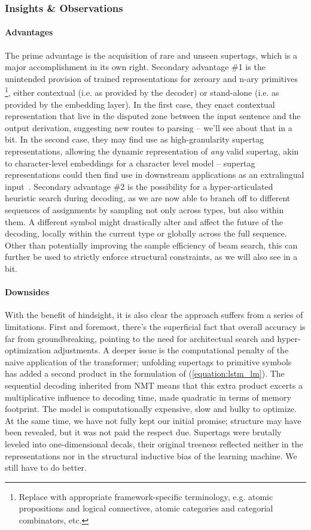 \subsubsection{Insights \& Observations}
\paragraph{Advantages}
The prime advantage is the acquisition of rare and unseen supertags, which is a major accomplishment in its own right.
Secondary advantage \#1 is the unintended provision of trained representations for zeroary and n-ary primitives%
	\footnote{Replace with appropriate framework-specific terminology, e.g. atomic propositions and logical connectives, atomic categories and categorial combinators, etc.},
either contextual (i.e. as provided by the decoder) or stand-alone (i.e. as provided by the embedding layer).
In the first case, they enact contextual representation that live in the disputed zone between the input sentence and the output derivation, suggesting new routes to parsing -- we'll see about that in a bit.
In the second case, they may find use as high-granularity supertag representations, allowing the dynamic representation of \textit{any} valid supertag, akin to character-level embeddings for a character level model -- supertag representations could then find use in downstream applications as an extralingual input~\cite{kasai-etal-2017-tag}.
Secondary advantage \#2 is the possibility for a hyper-articulated heuristic search during decoding, as we are now able to branch off to different sequences of assignments by sampling not only across types, but also within them.
A different symbol might drastically alter and affect the future of the decoding, locally within the current type or globally across the full sequence.
Other than potentially improving the sample efficiency of beam search, this can further be used to strictly enforce structural constraints, as we will also see in a bit.

\paragraph{Downsides}
With the benefit of hindsight, it is also clear the approach suffers from a series of limitations.
First and foremost, there's the superficial fact that overall accuracy is far from groundbreaking, pointing to the need for architectual search and hyper-optimization adjustments.
A deeper issue is the computational penalty of the naive application of the transformer; unfolding supertags to primitive symbols has added a second product in the formulation of (\ref{equation:lstm_lm}).
The sequential decoding inherited from NMT means that this extra product excerts a multiplicative influence to decoding time, made quadratic in terms of memory footprint.
The model is computationally expensive, slow and bulky to optimize.
At the same time, we have not fully kept our initial promise; structure may have been revealed, but it was not paid the respect due.
Supertags were brutally leveled into one-dimensional decals, their original treeness reflected neither in the representations nor in the structural inductive bias of the learning machine.
We still have to do better.

